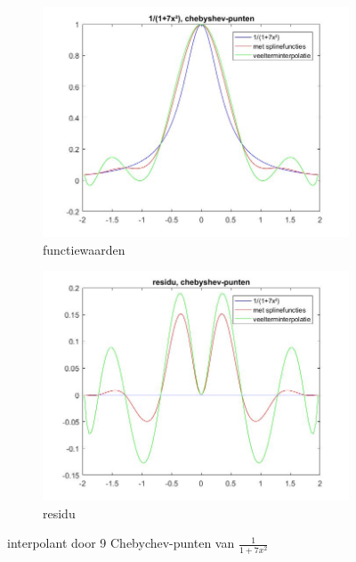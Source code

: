 \begin{figure}
\centering
\begin{subfigure}{.5\textwidth}
  \centering
  \includegraphics[width=\linewidth]{afbeeldingen/rat_cheb.jpg}
  \caption{functiewaarden}
\end{subfigure}%
\begin{subfigure}{.5\textwidth}
  \centering
  \includegraphics[width=\linewidth]{afbeeldingen/rat_cheb_res.jpg}
  \caption{residu}
\end{subfigure}
\caption{interpolant door 9 Chebychev-punten van  $\frac{1}{1+7x^2}$}
\label{fig:ratcheb}
\end{figure}